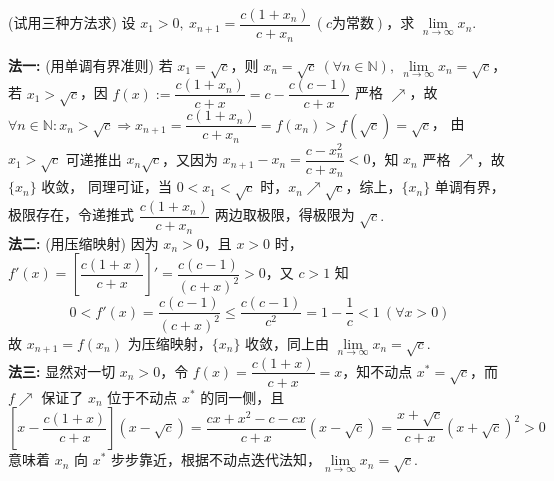 \begin{example}
    (试用三种方法求) 设 $x_1>0,~x_{n+1}=\dfrac{c(1+x_n)}{c+x_n}~  (c \text{为常数})$，求 $\lim\limits_{n\to\infty}x_n.$
\end{example}
\begin{solution}
    \textbf{法一: }(用单调有界准则) 若 $x_1=\sqrt{c}$，则 $x_n=\sqrt{c}~  (\forall n\in\mathbb{N}),~\lim\limits_{n\to\infty}x_n=\sqrt{c}$，
    若 $x_1>\sqrt{c}$，因 $f(x):=\dfrac{c(1+x_n)}{c+x}=c-\dfrac{c(c-1)}{c+x}$ 严格 $\nearrow$，故 $\forall n\in\mathbb{N}:x_n>\sqrt{c}\Rightarrow x_{n+1}=\dfrac{c(1+x_n)}{c+x_n}=f(x_n)>f\left(\sqrt{c}\right)=\sqrt{c}$，
    由 $x_1>\sqrt{c}$ 可递推出 $x_n\sqrt{c}$，又因为 $x_{n+1}-x_{n}=\dfrac{c-x_n^2}{c+x_n}<0$，知 $x_n$ 严格 $\nearrow$，故 $\{x_n\}$ 收敛，
    同理可证，当 $0<x_1<\sqrt{c}$ 时，$x_n\nearrow\sqrt{c}$，综上，$\{x_n\}$ 单调有界，极限存在，令递推式 $\dfrac{c(1+x_n)}{c+x_n}$ 两边取极限，得极限为 $\sqrt{c}.$\\
    \textbf{法二: }(用压缩映射) 因为 $x_n>0$，且 $x>0$ 时，$f'(x)=\left[\dfrac{c(1+x)}{c+x}\right]'=\dfrac{c(c-1)}{(c+x)^2}>0$，又 $c>1$ 知
    $$0<f'(x)=\dfrac{c(c-1)}{(c+x)^2}\leqslant\dfrac{c(c-1)}{c^2}=1-\dfrac{1}{c}<1~  (\forall x>0)$$
    故 $x_{n+1}=f(x_n)$ 为压缩映射，$\{x_n\}$ 收敛，同上由 $\lim\limits_{n\to\infty}x_n=\sqrt{c}.$\\
    \textbf{法三: }显然对一切 $x_n>0$，令 $f(x)=\dfrac{c(1+x)}{c+x}=x$，知不动点 $x^*=\sqrt{c}$，而 $f\nearrow$ 保证了 $x_n$ 位于不动点 $x^*$ 的同一侧，且
    $$\left[x-\dfrac{c(1+x)}{c+x}\right]\left(x-\sqrt{c}\right)=\dfrac{cx+x^2-c-cx}{c+x}\left(x-\sqrt{c}\right)=\dfrac{x+\sqrt{c}}{c+x}\left(x+\sqrt{c}\right)^2>0$$
    意味着 $x_n$ 向 $x^*$ 步步靠近，根据不动点迭代法知，$\lim\limits_{n\to\infty}x_n=\sqrt{c}.$
\end{solution}

